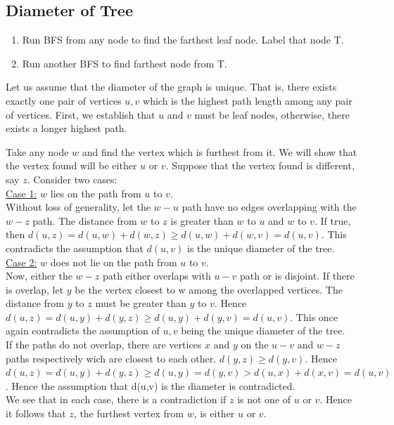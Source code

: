 \documentclass[]{book}
\makeatletter
\renewenvironment{proof}[1][\proofname] {\par\pushQED{\qed}\normalfont\topsep6\p@\@plus6\p@\relax\trivlist\item[\hskip\labelsep\bfseries#1\@addpunct{.}]\ignorespaces}{\popQED\endtrivlist\@endpefalse}
\makeatother
\begin{document}
      \subsection*{Diameter of Tree}
      \begin{enumerate}
        \item Run BFS from any node to find the farthest leaf node. Label that node T.
        \item Run another BFS to find farthest node from T.
      \end{enumerate}
      \begin{proof}
        Let us assume that the diameter of the graph is unique. That is, there exists exactly
        one pair of vertices ${u,v}$ which is the highest path length among any pair of vertices.
        First, we establish that $u$ and $v$ must be leaf nodes, otherwise, there exists a
        longer highest path.

        Take any node $w$ and find the vertex which is furthest from it. We will show that the vertex
        found will be either $u$ or $v$. Suppose that the vertex found is different, say $z$.
        Consider two cases:\\

        \underline{Case 1:} $w$ lies on the path from $u$ to $v$.\\
        Without loss of generality, let the $w-u$ path have no edges overlapping with the $w-z$ path.
        The distance from $w$ to $z$ is greater than $w$ to $u$ and $w$ to $v$. If true, then
        $d(u,z) = d(u,w) + d(w,z) \geq d(u,w) + d(w,v) = d(u,v)$. This contradicts the assumption that
        $d(u,v)$ is the unique diameter of the tree.\\

        \underline{Case 2:} $w$ does not lie on the path from $u$ to $v$.\\
        Now, either the $w-z$ path either overlaps with $u-v$ path or is disjoint. If there is overlap,
        let $y$ be the vertex closest to w among the overlapped vertices. The distance from $y$ to $z$
        must be greater than $y$ to $v$. Hence $d(u,z) = d(u,y) + d(y,z) \geq d(u,y) + d(y,v) = d(u,v)$.
        This once again contradicts the assumption of ${u,v}$ being the unique diameter of the tree.\\

        If the paths do not overlap, there are vertices $x$ and $y$ on the $u-v$ and $w-z$ paths
        respectively wich are closest to each other. $d(y,z) \geq d(y,v)$. Hence $d(u,z) = d(u,y) + d(y,z)
        \geq d(u,y) = d(y,v) > d(u,x) + d(x,v) = d(u,v)$. Hence the assumption that d(u,v) is the diameter
        is contradicted.\\

        We see that in each case, there is a contradiction if $z$ is not one of $u$ or $v$. Hence it follows
        that $z$, the furthest vertex from $w$, is either $u$ or $v$.
      \end{proof}
\end{document}
